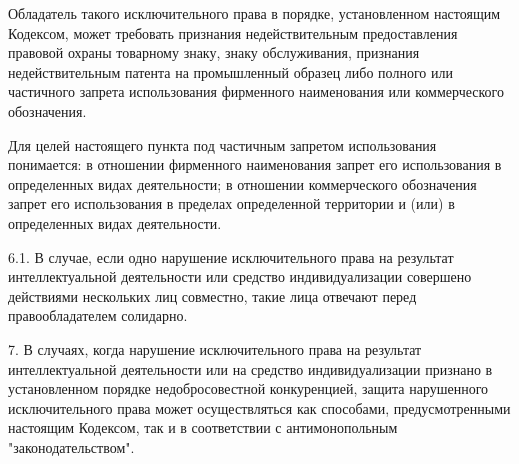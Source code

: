    Обладатель такого исключительного права в порядке, установленном настоящим Кодексом, может требовать признания недействительным предоставления правовой охраны товарному знаку, знаку обслуживания, признания недействительным патента на промышленный образец либо полного или частичного запрета использования фирменного наименования или коммерческого обозначения.
    
    Для целей настоящего пункта под частичным запретом использования понимается:
    в отношении фирменного наименования запрет его использования в определенных видах деятельности;
    в отношении коммерческого обозначения запрет его использования в пределах определенной территории и (или) в определенных видах деятельности.

6.1. В случае, если одно нарушение исключительного права на результат интеллектуальной деятельности или средство индивидуализации совершено действиями нескольких лиц совместно, такие лица отвечают перед правообладателем солидарно.

7. В случаях, когда нарушение исключительного права на результат интеллектуальной деятельности или на средство индивидуализации признано в установленном порядке недобросовестной конкуренцией, защита нарушенного исключительного права может осуществляться как способами, предусмотренными настоящим Кодексом, так и в соответствии с антимонопольным "законодательством".
